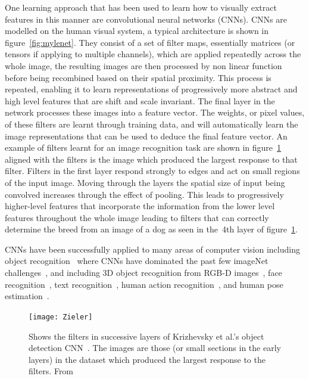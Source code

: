 \documentclass[11pt]{article} %
\begin{document}
One learning approach that has been used to learn how to visually extract features in this manner are convolutional neural networks (CNNs). CNNs are modelled on the human visual system, a typical architecture is shown in figure~\ref{fig:mylenet}. They consist of a set of filter maps, essentially matrices (or tensors if applying to multiple channels), which are applied repeatedly across the whole image, the resulting images are then processed by non linear function before being recombined based on their spatial proximity. This process is repeated, enabling it to learn representations of progressively more abstract and high level features that are shift and scale invariant. The final layer in the network processes these images into a feature vector. The weights, or pixel values, of these filters are learnt through training data, and will automatically learn the image representations that can be used to deduce the final feature vector. An example of filters learnt for an image recognition task are shown in figure~\ref{fig:exFilt} aligned with the filters is the image which produced the largest response to that filter. Filters in the first layer respond strongly to edges and act on small regions of the input image. Moving through the layers the spatial size of input being convolved increases through the effect of pooling. This leads to progressively higher-level features that incorporate the information from the lower level features throughout the whole image leading to filters that can correctly determine the breed from an image of a dog as seen in the~4th layer of figure~\ref{fig:exFilt}. 

CNNs have been successfully applied to many areas of computer vision including object recognition~\cite{LeCun2004,Kavukcuoglu2010,Krizhevsky2012,Zeiler2014,Sermanet2013b,Girshick2014,Simonyan2015,Szegedy2014} where CNNs have dominated the past few imageNet challenges~\cite{Russakovsky}, and including 3D object recognition from RGB-D images~\cite{Alexandre2013,Schwarz2015}, face recognition~\cite{Duffner2007,Osadchy2007,Taigman2014}, text recognition~\cite{LeCun1998,Wang2012}, human action recognition~\cite{Baccouche2011a,Le2011,Ji2013,Simonyan2014}, and human pose estimation~\cite{Pfister,Toshev,Jain2014,Jain2013a,Accv2014,Li2014}. 
\begin{figure}
\texttt{[image: Zieler]}
\caption{Shows the filters in successive layers of Krizhevsky et al.'s object detection CNN~\cite{Krizhevsky2012}. The images are those (or small sections in the early layers) in the dataset which produced the largest response to the filters.	From \cite{Zeiler2014}	\label{fig:exFilt}  } 
\end{figure}
\end{document}
